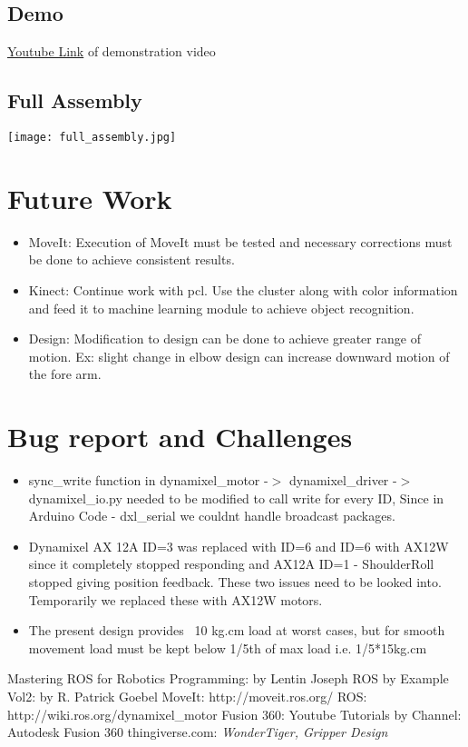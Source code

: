 \documentclass[a4paper,12pt,oneside]{book}
\begin{document}
	\subsection*{Demo}
	\href{http://www.youtube.com}{Youtube Link} of demonstration video
	\subsection*{Full Assembly}
	
	\begin{center}
	\texttt{[image: full\_assembly.jpg]}
\end{center}
	
	
	\section{Future Work}
	\begin{itemize}
		\item MoveIt:
		Execution of MoveIt must be tested and necessary corrections must be done to achieve consistent results.
		\item Kinect:
		Continue work with pcl.
		Use the cluster along with color information and feed it to machine learning module to achieve object recognition.
		\item Design:
		Modification to design can be done to achieve greater range of motion. Ex: slight change in elbow design can increase downward motion of the fore arm.
	\end{itemize}
	
	\section{Bug report and Challenges}
	\begin{itemize}
		\item sync\_write function in dynamixel\_motor -$>$ dynamixel\_driver -$>$ dynamixel\_io.py needed to be modified to call write for every ID, Since in Arduino Code - dxl\_serial we couldnt handle broadcast packages.
		\item Dynamixel AX 12A ID=3 was replaced with ID=6 and ID=6 with AX12W since it completely stopped responding and AX12A ID=1 - ShoulderRoll stopped giving position feedback. These two issues need to be looked into. Temporarily we replaced these with AX12W motors.
		\item The present design provides ~10 kg.cm load at worst cases, but for smooth movement load must be kept below 1/5th of max load i.e. 1/5*15kg.cm
	\end{itemize}
	
	
	\begin{thebibliography}{li}
		Mastering ROS for Robotics Programming: {by Lentin Joseph}
		ROS by Example Vol2: {by R. Patrick Goebel}
		MoveIt: {http://moveit.ros.org/}
		ROS: {http://wiki.ros.org/dynamixel\_motor}
		Fusion 360: {Youtube Tutorials by Channel: Autodesk Fusion 360}
		thingiverse.com:
		{\em  WonderTiger, Gripper Design }
		
	\end{thebibliography}
	
	
\end{document}
